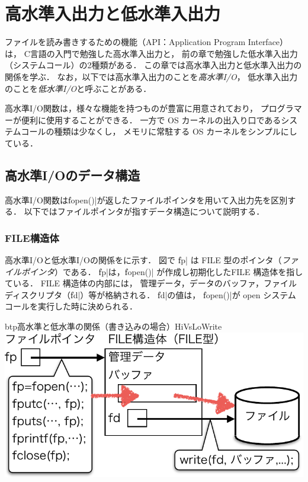 \chapter{高水準入出力と低水準入出力}

ファイルを読み書きするための機能（API：Application Program Interface）は，
C言語の入門で勉強した高水準入出力と，
前の章で勉強した低水準入出力（システムコール）の2種類がある．
この章では高水準入出力と低水準入出力の関係を学ぶ．
なお，以下では高水準入出力のことを{\em 高水準I/O}，
低水準入出力のことを{\em 低水準I/O}と呼ぶことがある．

高水準I/O関数は，様々な機能を持つものが豊富に用意されており，
プログラマーが便利に使用することができる．
一方で OS カーネルの出入り口であるシステムコールの種類は少なくし，
メモリに常駐する OS カーネルをシンプルにしている．

\section{高水準I/Oのデータ構造}
高水準I/O関数は\|fopen()|が返したファイルポインタを用いて入出力先を区別する．
以下ではファイルポインタが指すデータ構造について説明する．

\subsection{FILE構造体}
高水準I/Oと低水準I/Oの関係をに示す．
図で \|fp| は FILE 型のポインタ（{\em ファイルポインタ}）である．
\|fp|は，\|fopen()| が作成し初期化したFILE 構造体を指している．
FILE 構造体の内部には，
管理データ，データのバッファ，ファイルディスクリプタ（\|fd|）等が格納される．
\|fd|の値は，
\|fopen()|が open システムコールを実行した時に決められる．

\begin{myfig}{btp}{高水準と低水準の関係（書き込みの場合）}{HiVsLoWrite}
\includegraphics[scale=0.7]{Fig/HiVsLoWrite-crop.pdf}
\end{myfig}

